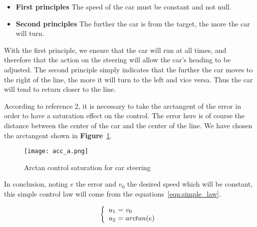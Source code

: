 \begin{itemize}
    \item \textbf{First principles} The speed of the car must be constant and not null.
    \item \textbf{Second principles} The further the car is from the target, the more the car will turn.
\end{itemize}

With the first principle, we ensure that the car will run at all times, and therefore that
the action on the steering will allow the car's heading to be adjusted. The second principle
simply indicates that the further the car moves to the right of the line, the more it will 
turn to the left and vice versa. Thus the car will tend to return closer to the line.

According to reference 2, it is necessary to take the arctangent of the error in order to
have a saturation effect on the control. The error here is of course the distance between
the center of the car and the center of the line. We have chosen the arctangent shown in
\textbf{Figure}~\ref{fig:arctan}.

\begin{figure}[!ht]
    \begin{center}
        \texttt{[image: acc\_a.png]}
    \end{center}
    \caption{Arctan control saturation for car steering}
    \label{fig:arctan}
\end{figure}

In conclusion, noting $e$ the error and $v_0$ the desired speed which will be constant,
this simple control law will come from the equations~\ref{eqn:simple_law}.

\begin{equation}
    \label{eqn:simple_law}
    \left\{
        \begin{array}{c @{=} l}
            u_1\ & \ v_0 \\
            u_2\ & \ arctan(e)
        \end{array}
    \right. 
\end{equation}



\newpage